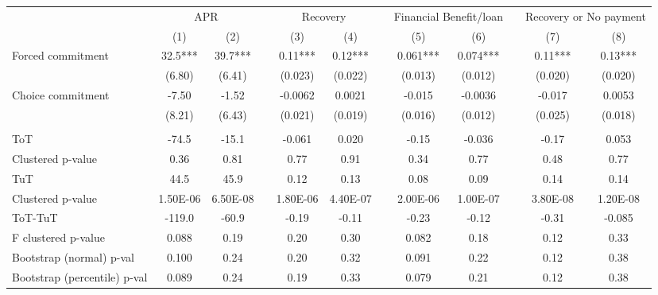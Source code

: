 \begin{tabular}{lccccccccccc}
\toprule
      & \multicolumn{2}{c}{APR} &       & \multicolumn{2}{c}{Recovery} &       & \multicolumn{2}{c}{Financial Benefit/loan} &       & \multicolumn{2}{c}{Recovery or No payment} \\
\cmidrule{2-3}\cmidrule{5-6}\cmidrule{8-9}\cmidrule{11-12}      & (1)   & (2)   &       & (3)   & (4)   &       & (5)   & (6)   &       & (7)   & (8) \\
\midrule
\midrule
Forced commitment & 32.5*** & 39.7*** &       & 0.11*** & 0.12*** &       & 0.061*** & 0.074*** &       & 0.11*** & 0.13*** \\
      & (6.80) & (6.41) &       & (0.023) & (0.022) &       & (0.013) & (0.012) &       & (0.020) & (0.020) \\
Choice commitment & -7.50 & -1.52 &       & -0.0062 & 0.0021 &       & -0.015 & -0.0036 &       & -0.017 & 0.0053 \\
      & (8.21) & (6.43) &       & (0.021) & (0.019) &       & (0.016) & (0.012) &       & (0.025) & (0.018) \\
      &       &       &       &       &       &       &       &       &       &       &  \\
\midrule
\rowcolor[rgb]{ .949,  .949,  .949} ToT   & -74.5 & -15.1 &       & -0.061 & 0.020 &       & -0.15 & -0.036 &       & -0.17 & 0.053 \\
Clustered p-value & 0.36  & 0.81  &       & 0.77  & 0.91  &       & 0.34  & 0.77  &       & 0.48  & 0.77 \\
\rowcolor[rgb]{ .949,  .949,  .949} TuT   & 44.5  & 45.9  &       & 0.12  & 0.13  &       & 0.08  & 0.09  &       & 0.14  & 0.14 \\
Clustered p-value & 1.50E-06 & 6.50E-08 &       & 1.80E-06 & 4.40E-07 &       & 2.00E-06 & 1.00E-07 &       & 3.80E-08 & 1.20E-08 \\
\rowcolor[rgb]{ .949,  .949,  .949} ToT-TuT & -119.0 & -60.9 &       & -0.19 & -0.11 &       & -0.23 & -0.12 &       & -0.31 & -0.085 \\
F clustered p-value & 0.088 & 0.19  &       & 0.20  & 0.30  &       & 0.082 & 0.18  &       & 0.12  & 0.33 \\
Bootstrap (normal) p-val & 0.100 & 0.24  &       & 0.20  & 0.32  &       & 0.091 & 0.22  &       & 0.12  & 0.38 \\
Bootstrap (percentile) p-val & 0.089 & 0.24  &       & 0.19  & 0.33  &       & 0.079 & 0.21  &       & 0.12  & 0.38 \\

\end{tabular}
